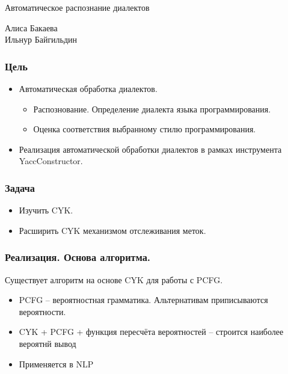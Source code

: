 \documentclass{beamer}
\begin{document}

\author[Алиса Бакаева]{}

\begin{frame}
	\transwipe[direction=90]
	\begin{block}{}
	    \begin{center}
	        \huge{Автоматическое распознание диалектов}
	    \end{center}
	\end{block}
	\begin{center}
	    \huge
	        {Алиса Бакаева
	        \\
            Ильнур Байгильдин}
	\end{center}
\end{frame}    

\begin{frame}
	\transwipe[direction=90]
    \frametitle{Цель}
    \begin{itemize}
        \item Автоматическая обработка диалектов.
            \begin{itemize}
                \item Распознование. Определение диалекта языка программирования.
                \item Оценка соответствия выбранному стилю программирования.
            \end{itemize}
        \item Реализация автоматической обработки диалектов в рамках инструмента YaccConstructor.
    \end{itemize}
\end{frame}

\begin{frame}
	\transwipe[direction=90]
	\frametitle{Задача}
	\begin{itemize}
        \item Изучить CYK.
        \item Расширить CYK механизмом отслеживания меток.
    \end{itemize}
\end{frame}

\begin{frame}
	\transwipe[direction=90]
	\frametitle{Реализация. Основа алгоритма.}
	Существует алгоритм на основе CYK для работы с PCFG.
	\begin{itemize}
        \item PCFG -- вероятностная грамматика. Альтернативам приписываются вероятности. 
        \item CYK + PCFG + функция пересчёта вероятностей -- строится наиболее вероятнй вывод
        \item Применяется в NLP
    \end{itemize}
\end{frame}    
\end{document}
